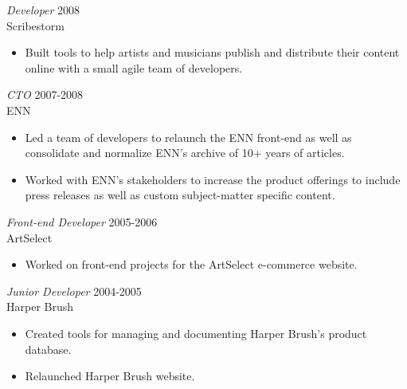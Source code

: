 \documentclass[line,margin]{res}
\begin{document}
\begin{resume}
\begin{samepage}
\begin{itemize}
        \end{itemize}
    \end{samepage}

    \begin{samepage}
        {\sl Developer}
        \hfill 2008 \\
        Scribestorm
        \begin{itemize} \itemsep -2pt
            \item
                  Built tools to help artists and musicians publish and distribute
                  their content online with a small agile team of developers.

        \end{itemize}
    \end{samepage}

    {\sl CTO}
    \hfill 2007-2008 \\
    ENN
    \begin{itemize} \itemsep -2pt
        \item
              Led a team of developers to relaunch the ENN front-end as well as
              consolidate and normalize ENN's archive of 10+ years of articles.

        \item
              Worked with ENN's stakeholders to increase the product offerings
              to include press releases as well as custom subject-matter
              specific content.
    \end{itemize}

    {\sl Front-end Developer}
    \hfill 2005-2006 \\
    ArtSelect
    \begin{itemize} \itemsep -2pt
        \item
              Worked on front-end projects for the ArtSelect e-commerce website.
    \end{itemize}

    {\sl Junior Developer}
    \hfill 2004-2005 \\
    Harper Brush
    \begin{itemize} \itemsep -2pt
        \item
              Created tools for managing and documenting Harper Brush's product
              database.

        \item
              Relaunched Harper Brush website.
    \end{itemize}


\end{resume}
\end{document}
